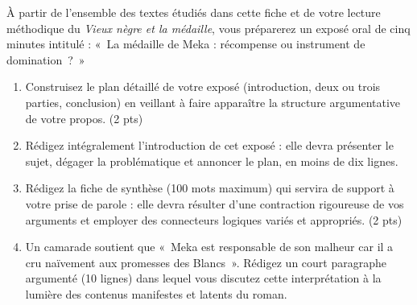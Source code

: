 \documentclass[11pt]{article}
\begin{document}
\begin{exercice}
À partir de l'ensemble des textes étudiés dans cette fiche et de votre lecture méthodique du \textit{Vieux nègre et la médaille}, vous préparerez un exposé oral de cinq minutes intitulé : «~La médaille de Meka : récompense ou instrument de domination~?~»

\begin{enumerate}
\item Construisez le plan détaillé de votre exposé (introduction, deux ou trois parties, conclusion) en veillant à faire apparaître la structure argumentative de votre propos. (2 pts)
\item Rédigez intégralement l'introduction de cet exposé : elle devra présenter le sujet, dégager la problématique et annoncer le plan, en moins de dix lignes.
\item Rédigez la fiche de synthèse (100 mots maximum) qui servira de support à votre prise de parole : elle devra résulter d'une contraction rigoureuse de vos arguments et employer des connecteurs logiques variés et appropriés. (2 pts)
\item Un camarade soutient que «~Meka est responsable de son malheur car il a cru naïvement aux promesses des Blancs~». Rédigez un court paragraphe argumenté (10 lignes) dans lequel vous discutez cette interprétation à la lumière des contenus manifestes et latents du roman.
\end{enumerate}
\end{exercice}
\end{document}
